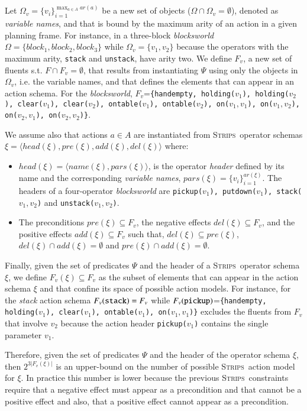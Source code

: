 \documentclass[3p,times]{elsarticle}
\newcommand{\strips}{\textsc{Strips}}     %
\newcommand{\tup}[1]{{\langle #1 \rangle}}
\begin{document}
Let $\Omega_v=\{v_i\}_{i=1}^{\operatorname*{max}_{a\in A} ar(a)}$ be a new set of objects ($\Omega\cap\Omega_v=\emptyset$), denoted as {\em variable names}, and that is bound by the maximum arity of an action in a given planning frame. For instance, in a three-block {\em blocksworld} $\Omega=\{block_1, block_2, block_3\}$ while $\Omega_v=\{v_1, v_2\}$ because the operators with the maximum arity, {\small\tt stack} and {\small\tt unstack}, have arity two. We define $F_v$, a new set of fluents s.t. $F\cap F_v=\emptyset$, that results from instantiating $\Psi$ using only the objects in $\Omega_v$, i.e. the variable names, and that defines the elements that can appear in an action schema. For the {\em blocksworld}, $F_v$={\small\tt\{handempty, holding($v_1$), holding($v_2$), clear($v_1$), clear($v_2$), ontable($v_1$), ontable($v_2$), on($v_1,v_1$), on($v_1,v_2$), on($v_2,v_1$), on($v_2,v_2$)\}}.

We assume also that actions $a\in A$ are instantiated from \strips\ operator schemas $\xi=\tup{head(\xi),pre(\xi),add(\xi),del(\xi)}$ where:
\begin{itemize}
\item $head(\xi)=\tup{name(\xi),pars(\xi)}$, is the operator {\em header} defined by its name and the corresponding {\em variable names}, $pars(\xi)=\{v_i\}_{i=1}^{ar(\xi)}$. The headers of a four-operator {\em blocksworld} are {\small\tt pickup($v_1$), putdown($v_1$), stack($v_1,v_2$)} and {\small\tt unstack($v_1,v_2$)}.
\item The preconditions $pre(\xi)\subseteq F_v$, the negative effects $del(\xi)\subseteq F_v$, and the positive effects $add(\xi)\subseteq F_v$ such that, $del(\xi)\subseteq pre(\xi)$, $del(\xi)\cap add(\xi)=\emptyset$ and $pre(\xi)\cap add(\xi)=\emptyset$.
\end{itemize}

Finally, given the set of predicates $\Psi$ and the header of a \strips\ operator schema $\xi$, we define $F_v(\xi)\subseteq F_v$ as the subset of elements that can appear in the action schema $\xi$ and that confine its space of possible action models. For instance, for the {\em stack} action schema $F_v({\tt stack})=F_v$ while $F_v({\tt pickup})$={\small\tt\{handempty, holding($v_1$), clear($v_1$), ontable($v_1$), on($v_1,v_1$)\}} excludes the fluents from $F_v$ that involve $v_2$ because the action header {\small\tt pickup($v_1$)} contains the single parameter $v_1$.

Therefore, given the set of predicates $\Psi$ and the header of the operator schema $\xi$, then $2^{3|F_v(\xi)|}$ is an upper-bound on the number of possible \strips\ action model for $\xi$. In practice this number is lower because the previous \strips\ constraints require that a negative effect must appear as a precondition and that cannot be a positive effect and also, that a positive effect cannot appear as a precondition.
\end{document}

